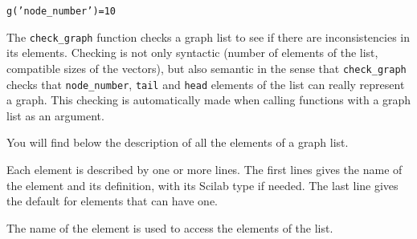\documentclass[11pt]{article}
\newcommand{\func}[1]{\texttt{#1}}
\begin{document}
\texttt{g('node\_number')=10}

The \func{check\_graph} function checks a graph list to see if
there are inconsistencies in its elements. Checking is not only
syntactic (number of elements of the list, compatible sizes 
of the vectors), but also semantic in the sense that 
\func{check\_graph} checks that \texttt{node\_number}, \texttt{tail} and 
\texttt{head} elements of the list can really represent a  graph.
This checking is automatically made when calling functions with a
graph list as an argument.

You will find below the description of all the elements of a graph list.

Each element is described by one or more lines.
The first lines gives the name of the element and
its definition, with its Scilab type if
needed.
The last line gives the default for elements that can have one.

The name of the element is used to access 
the elements
of the list.
\end{document}
